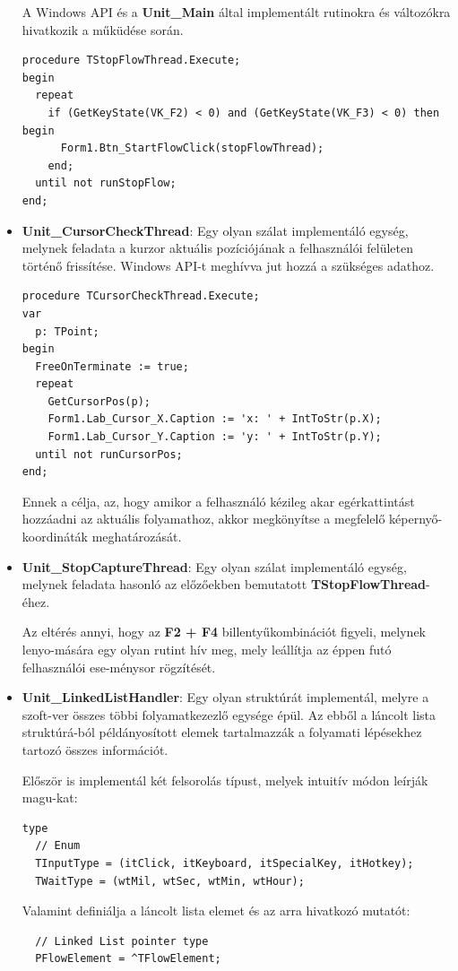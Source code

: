 \begin{itemize}
{A Windows API és a \textbf{Unit\_Main} által implementált rutinokra és változókra hivatkozik a műküdése során.
		\begin{lstlisting}
procedure TStopFlowThread.Execute;
begin
  repeat
    if (GetKeyState(VK_F2) < 0) and (GetKeyState(VK_F3) < 0) then begin
      Form1.Btn_StartFlowClick(stopFlowThread);
    end;
  until not runStopFlow;
end;
		\end{lstlisting}
	}
	\item{
		\textbf{Unit\_CursorCheckThread}: Egy olyan szálat implementáló egység, melynek feladata a kurzor aktuális pozíciójának a felhasználói felületen történő frissítése. Windows API-t meghívva jut hozzá a szükséges adathoz.
		\begin{lstlisting}
procedure TCursorCheckThread.Execute;
var
  p: TPoint;
begin
  FreeOnTerminate := true;
  repeat
    GetCursorPos(p);
    Form1.Lab_Cursor_X.Caption := 'x: ' + IntToStr(p.X);
    Form1.Lab_Cursor_Y.Caption := 'y: ' + IntToStr(p.Y);
  until not runCursorPos;
end;
		\end{lstlisting}
		Ennek a célja, az, hogy amikor a felhasználó kézileg akar egérkattintást hozzáadni az aktuális folyamathoz, akkor megkönyítse a megfelelő képernyő-koordináták meghatározását.
	}
	\item{
		\textbf{Unit\_StopCaptureThread}: Egy olyan szálat implementáló egység, melynek feladata hasonló az előzőekben bemutatott \textbf{TStopFlowThread}-éhez.

Az eltérés annyi, hogy az \textbf{F2 + F4} billentyűkombinációt figyeli, melynek lenyo\hyp{}mására egy olyan rutint hív meg, mely leállítja az éppen futó felhasználói ese\hyp{}ménysor rögzítését.
	}
	\item{
		\textbf{Unit\_LinkedListHandler}: Egy olyan struktúrát implementál, melyre a szoft\hyp{}ver összes többi folyamatkezezlő egysége épül. Az ebből a láncolt lista struktúrá\hyp{}ból példányosított elemek tartalmazzák a folyamati lépésekhez tartozó összes információt.

	Először is implementál két felsorolás típust, melyek intuitív módon leírják magu\hyp{}kat:
	\begin{lstlisting}
type
  // Enum
  TInputType = (itClick, itKeyboard, itSpecialKey, itHotkey);
  TWaitType = (wtMil, wtSec, wtMin, wtHour);
	\end{lstlisting}

	Valamint definiálja a láncolt lista elemet és az arra hivatkozó mutatót:
	\begin{lstlisting}
  // Linked List pointer type
  PFlowElement = ^TFlowElement;


\end{lstlisting}}
\end{itemize}
